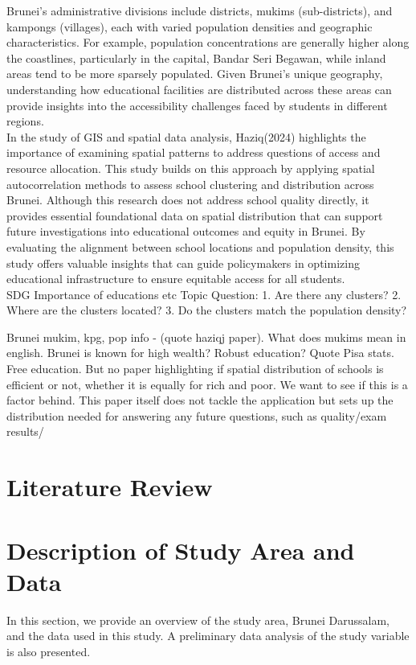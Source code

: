 \documentclass[12pt]{article}
\begin{document}
Brunei’s administrative divisions include districts, mukims (sub-districts), and kampongs (villages), each with varied population densities and geographic characteristics. For example, population concentrations are generally higher along the coastlines, particularly in the capital, Bandar Seri Begawan, while inland areas tend to be more sparsely populated. Given Brunei’s unique geography, understanding how educational facilities are distributed across these areas can provide insights into the accessibility challenges faced by students in different regions. \\

In the study of GIS and spatial data analysis, Haziq(2024) highlights the importance of examining spatial patterns to address questions of access and resource allocation. This study builds on this approach by applying spatial autocorrelation methods to assess school clustering and distribution across Brunei. Although this research does not address school quality directly, it provides essential foundational data on spatial distribution that can support future investigations into educational outcomes and equity in Brunei. By evaluating the alignment between school locations and population density, this study offers valuable insights that can guide policymakers in optimizing educational infrastructure to ensure equitable access for all students. \\

SDG
Importance of educations etc
Topic Question:
	1. Are there any clusters?
	2. Where are the clusters located?
	3. Do the clusters match the population density?

Brunei mukim, kpg, pop info -  (quote haziqj paper). What does mukims mean in english.
Brunei is known for high wealth? Robust education? Quote Pisa stats. Free education. But no paper highlighting if spatial distribution of schools is efficient or not, whether it is equally for rich and poor. We want to see if this is a factor behind. This paper itself does not tackle the application but sets up the distribution needed for answering any future questions, such as quality/exam results/

\section{Literature Review}
\label{sec: lit rev}
 

\section{Description of Study Area and Data}
\label{sec: study area and data}
In this section, we provide an overview of the study area, Brunei Darussalam, and the data used in this study. A preliminary data analysis of the study variable is also presented.
\end{document}
